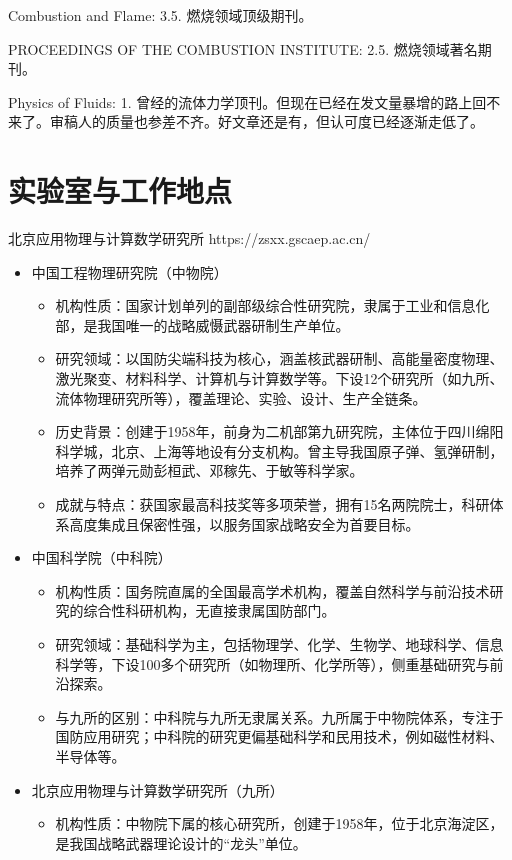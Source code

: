 \documentclass{book}
\begin{document}
Combustion and Flame: 3.5. 燃烧领域顶级期刊。

PROCEEDINGS OF THE COMBUSTION INSTITUTE: 2.5. 燃烧领域著名期刊。

Physics of Fluids: 1. 曾经的流体力学顶刊。但现在已经在发文量暴增的路上回不来了。审稿人的质量也参差不齐。好文章还是有，但认可度已经逐渐走低了。
\section{实验室与工作地点}
北京应用物理与计算数学研究所
https://zsxx.gscaep.ac.cn/


\begin{itemize}
    \item 中国工程物理研究院（中物院）​
    \begin{itemize}
        \item ​机构性质：国家计划单列的副部级综合性研究院，隶属于工业和信息化部，是我国唯一的战略威慑武器研制生产单位。
        \item ​研究领域：以国防尖端科技为核心，涵盖核武器研制、高能量密度物理、激光聚变、材料科学、计算机与计算数学等。下设12个研究所（如九所、流体物理研究所等），覆盖理论、实验、设计、生产全链条。
        \item ​历史背景：创建于1958年，前身为二机部第九研究院，主体位于四川绵阳科学城，北京、上海等地设有分支机构。曾主导我国原子弹、氢弹研制，培养了两弹元勋彭桓武、邓稼先、于敏等科学家。
        \item ​成就与特点：获国家最高科技奖等多项荣誉，拥有15名两院院士，科研体系高度集成且保密性强，以服务国家战略安全为首要目标。
    \end{itemize}
    \item 中国科学院（中科院）​
    \begin{itemize}
        \item ​机构性质：国务院直属的全国最高学术机构，覆盖自然科学与前沿技术研究的综合性科研机构，无直接隶属国防部门。
        \item ​研究领域：基础科学为主，包括物理学、化学、生物学、地球科学、信息科学等，下设100多个研究所（如物理所、化学所等），侧重基础研究与前沿探索。
        \item ​与九所的区别：中科院与九所无隶属关系。九所属于中物院体系，专注于国防应用研究；中科院的研究更偏基础科学和民用技术，例如磁性材料、半导体等。
    \end{itemize}
    \item 北京应用物理与计算数学研究所（九所）​
    \begin{itemize}
        \item ​机构性质：中物院下属的核心研究所，创建于1958年，位于北京海淀区，是我国战略武器理论设计的“龙头”单位。

\end{itemize}
\end{itemize}
\end{document}
